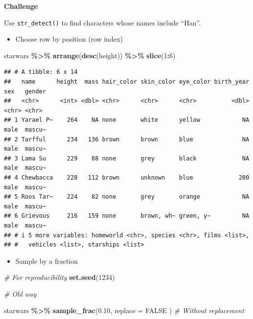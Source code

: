 \documentclass[
]{book}
\newenvironment{Shaded}{\begin{snugshade}}{\end{snugshade}}
\newcommand{\AttributeTok}[1]{\textcolor[rgb]{0.13,0.29,0.53}{#1}}
\newcommand{\CommentTok}[1]{\textcolor[rgb]{0.56,0.35,0.01}{\textit{#1}}}
\newcommand{\ConstantTok}[1]{\textcolor[rgb]{0.56,0.35,0.01}{#1}}
\newcommand{\DecValTok}[1]{\textcolor[rgb]{0.00,0.00,0.81}{#1}}
\newcommand{\FloatTok}[1]{\textcolor[rgb]{0.00,0.00,0.81}{#1}}
\newcommand{\FunctionTok}[1]{\textcolor[rgb]{0.13,0.29,0.53}{\textbf{#1}}}
\newcommand{\NormalTok}[1]{#1}
\newcommand{\SpecialCharTok}[1]{\textcolor[rgb]{0.81,0.36,0.00}{\textbf{#1}}}
\providecommand{\tightlist}{%
  \setlength{\itemsep}{0pt}\setlength{\parskip}{0pt}}
\begin{document}
\textbf{Challenge}

Use \texttt{str\_detect()} to find characters whose names include ``Han''.

\begin{itemize}
\tightlist
\item
  Choose row by position (row index)
\end{itemize}

\begin{Shaded}
\begin{Highlighting}[]
\NormalTok{starwars }\SpecialCharTok{\%\textgreater{}\%}
  \FunctionTok{arrange}\NormalTok{(}\FunctionTok{desc}\NormalTok{(height)) }\SpecialCharTok{\%\textgreater{}\%}
  \FunctionTok{slice}\NormalTok{(}\DecValTok{1}\SpecialCharTok{:}\DecValTok{6}\NormalTok{)}
\end{Highlighting}
\end{Shaded}

\begin{verbatim}
## # A tibble: 6 x 14
##   name      height  mass hair_color skin_color eye_color birth_year sex   gender
##   <chr>      <int> <dbl> <chr>      <chr>      <chr>          <dbl> <chr> <chr> 
## 1 Yarael P~    264    NA none       white      yellow            NA male  mascu~
## 2 Tarfful      234   136 brown      brown      blue              NA male  mascu~
## 3 Lama Su      229    88 none       grey       black             NA male  mascu~
## 4 Chewbacca    228   112 brown      unknown    blue             200 male  mascu~
## 5 Roos Tar~    224    82 none       grey       orange            NA male  mascu~
## 6 Grievous     216   159 none       brown, wh~ green, y~         NA male  mascu~
## # i 5 more variables: homeworld <chr>, species <chr>, films <list>,
## #   vehicles <list>, starships <list>
\end{verbatim}

\begin{itemize}
\tightlist
\item
  Sample by a fraction
\end{itemize}

\begin{Shaded}
\begin{Highlighting}[]
\CommentTok{\# For reproducibility}
\FunctionTok{set.seed}\NormalTok{(}\DecValTok{1234}\NormalTok{)}

\CommentTok{\# Old way}

\NormalTok{starwars }\SpecialCharTok{\%\textgreater{}\%}
  \FunctionTok{sample\_frac}\NormalTok{(}\FloatTok{0.10}\NormalTok{,}
    \AttributeTok{replace =} \ConstantTok{FALSE}
\NormalTok{  ) }\CommentTok{\# Without replacement}
\end{Highlighting}
\end{Shaded}
\end{document}
